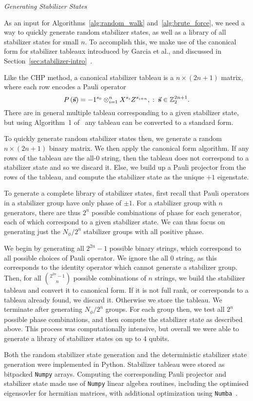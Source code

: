 \par\large{\itshape{Generating Stabilizer States}}\par
As an input for Algorithms~\ref{alg:random_walk} and~\ref{alg:brute_force}, we need a way to quickly generate random stabilizer states, as well as a library of all stabilizer states for small $n$. To accomplish this, we make use of the canonical form for stabilizer tableaux introduced by Garcia et al., and discussed in Section~\ref{sec:stabilizer-intro}~\cite{Garcia2012}.\par
Like the CHP method, a canonical stabilizer tableau is a $n \times \left(2n+1\right)$ matrix, where each row encodes a Pauli operator
\[P\left(\va{s}\right)=-1^{s_{0}}\otimes_{i=1}^{n}X^{s_{i}}Z^{s_{i+n}},\;:\;\va{s}\in\mathbb{Z}_{2}^{2n+1}.\]
There are in general multiple tableau corresponding to a given stabilizer state, but using Algorithm~1 of~\cite{Garcia2012} any tableau can be converted to a standard form.\par
To quickly generate random stabilizer states then, we generate a random $n \times \left(2n+1\right)$ binary matrix. We then apply the canonical form algorithm. If any rows of the tableau are the all-$0$ string, then the tableau does not correspond to a stabilizer state and so we discard it. Else, we build up a Pauli projector from the rows of the tableau, and compute the stabilizer state as the unique $+1$ eigenstate.\par
To generate a complete library of stabilizer states, first recall that Pauli operators in a stabilizer group have only phase of $\pm 1$. For a stabilizer group with $n$ generators, there are thus $2^{n}$ possible combinations of phase for each generator, each of which correspond to a given stabilizer state. We can thus focus on generating just the $N_{\phi}/2^{n}$ stabilizer groups with all positive phase.\par
We begin by generating all $2^{2n}-1$ possible binary strings, which correspond to all possible choices of Pauli operator. We ignore the all $0$ string, as this corresponds to the identity operator which cannot generate a stabilizer group. Then, for all $\binom{2^{2n}-1}{n}$ possible combinations of $n$ strings, we build the stabilizer tableau and convert it to canonical form. If it is not full rank, or corresponds to a tableau already found, we discard it. Otherwise we store the tableau. We terminate after generating $N_{\phi}/2^{n}$ groups. For each group then, we test all $2^{n}$ possible phase combinations, and then compute the stabilizer state as described above. This process was computationally intensive, but overall we were able to generate a library of stabilizer states on up to $4$ qubits.\par
Both the random stabilizer state generation and the deterministic stabilizer state generation were implemented in Python. Stabilizer tableau were stored as bitpacked \texttt{Numpy} arrays. Computing the corresponding Pauli projector and stabilizer state made use of \texttt{Numpy} linear algebra routines, including the optimised eigensovler for hermitian matrices, with additional optimization using \texttt{Numba}~\cite{Numpy,Numba}.
